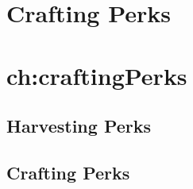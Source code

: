 \chapter{Crafting Perks}\chapter{ch:craftingPerks}
\section{Harvesting Perks}\label{sec:harvestingPerks}









\section{Crafting Perks}\label{sec:craftingPerks}












